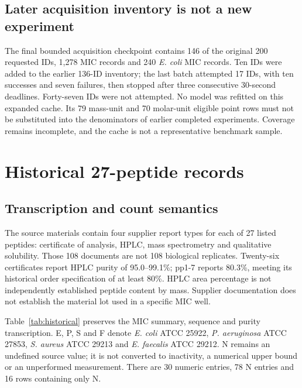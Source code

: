 \documentclass[12pt,a4paper]{article}
\begin{document}
\subsection{Later acquisition inventory is not a new experiment}
The final bounded acquisition checkpoint contains 146 of the original 200 requested IDs, 1,278 MIC records and 240 \textit{E. coli} MIC records. Ten IDs were added to the earlier 136-ID inventory; the last batch attempted 17 IDs, with ten successes and seven failures, then stopped after three consecutive 30-second deadlines. Forty-seven IDs were not attempted. No model was refitted on this expanded cache. Its 79 mass-unit and 70 molar-unit eligible point rows must not be substituted into the denominators of earlier completed experiments. Coverage remains incomplete, and the cache is not a representative benchmark sample.

\section{Historical 27-peptide records}
\subsection{Transcription and count semantics}
The source materials contain four supplier report types for each of 27 listed peptides: certificate of analysis, HPLC, mass spectrometry and qualitative solubility. Those 108 documents are not 108 biological replicates. Twenty-six certificates report HPLC purity of 95.0--99.1\%; pp1-7 reports 80.3\%, meeting its historical order specification of at least 80\%. HPLC area percentage is not independently established peptide content by mass. Supplier documentation does not establish the material lot used in a specific MIC well.

Table~\ref{tab:historical} preserves the MIC summary, sequence and purity transcription. E, P, S and F denote \textit{E. coli} ATCC 25922, \textit{P. aeruginosa} ATCC 27853, \textit{S. aureus} ATCC 29213 and \textit{E. faecalis} ATCC 29212. N remains an undefined source value; it is not converted to inactivity, a numerical upper bound or an unperformed measurement. There are 30 numeric entries, 78 N entries and 16 rows containing only N.
\end{document}
